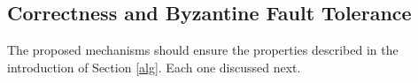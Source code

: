 

\subsection{Correctness and Byzantine Fault Tolerance}

The proposed mechanisms should ensure the properties described in the introduction of Section \ref{alg}.
Each one discussed next.

